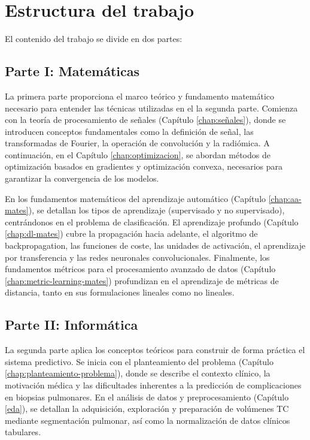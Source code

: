 \section{Estructura del trabajo}
El contenido del trabajo se divide en dos partes:

\subsection*{Parte I: Matemáticas}

La primera parte proporciona el marco teórico y fundamento matemático necesario para entender las técnicas utilizadas en el la segunda parte. Comienza con la teoría de procesamiento de señales (Capítulo \ref{chap:señales}), donde se introducen conceptos fundamentales como la definición de señal, las transformadas de Fourier, la operación de convolución y la radiómica. A continuación, en  el Capítulo \ref{chap:optimizacion}, se abordan métodos de optimización basados en gradientes y optimización convexa, necesarios para garantizar la convergencia de los modelos.

En los fundamentos matemáticos del aprendizaje automático (Capítulo \ref{chap:aa-mates}), se detallan los tipos de aprendizaje (supervisado y no supervisado), centrándonos en el problema de clasificación. El aprendizaje profundo (Capítulo \ref{chap:dl-mates}) cubre la propagación hacia adelante, el algoritmo de backpropagation, las funciones de coste, las unidades de activación, el aprendizaje por transferencia y las redes neuronales convolucionales. Finalmente, los fundamentos métricos para el procesamiento avanzado de datos (Capítulo \ref{chap:metric-learning-mates}) profundizan en el aprendizaje de métricas de distancia, tanto en sus formulaciones lineales como no lineales.

\subsection*{Parte II: Informática}

La segunda parte aplica los conceptos teóricos para construir de forma práctica el sistema predictivo. Se inicia con el planteamiento del problema (Capítulo \ref{chap:planteamiento-problema}), donde se describe el contexto clínico, la motivación médica y las dificultades inherentes a la predicción de complicaciones en biopsias pulmonares. En el análisis de datos y preprocesamiento (Capítulo \ref{eda}), se detallan la adquisición, exploración y preparación de volúmenes TC mediante segmentación pulmonar, así como la normalización de datos clínicos tabulares.

